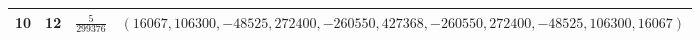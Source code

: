 \begin{longtable}{rcll}
10&12&$\frac{5}{299376}$&\begin{minipage}[t]{.55\textwidth}\raggedright\small $(16067,\allowbreak 106300,\allowbreak -48525,\allowbreak 272400,\allowbreak -260550,\allowbreak 427368,\allowbreak -260550,\allowbreak 272400,\allowbreak -48525,\allowbreak 106300,\allowbreak 16067)$\end{minipage}\\[4pt]
\bottomrule
\end{longtable}
